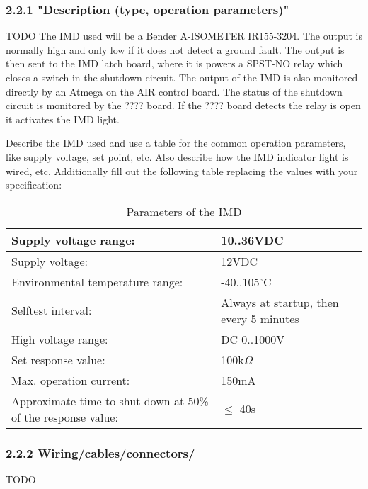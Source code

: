 \documentclass{article}
\begin{document}
\subsubsection*{2.2.1 "Description (type, operation parameters)"}

TODO
The IMD used will be a Bender A-ISOMETER IR155-3204. The output is normally high and only low if it does not detect a ground fault. The output is then sent to the IMD latch board, where it is powers a SPST-NO relay which closes a switch in the shutdown circuit. The output of the IMD is also monitored directly by an Atmega on the AIR control board. The status of the shutdown circuit is monitored by the ???? board. If the ???? board detects the relay is  open it activates the IMD light.


Describe the IMD used and use a table for the common operation parameters, like supply voltage, set point, etc. Also describe how the IMD indicator light is wired, etc.
Additionally fill out the following table replacing the values with your specification:


\begin{center}
	\begin{table}
		\begin{tabular}{|l|l|}
			\hline
			Supply voltage range: &  10..36VDC \\
			\hline
			Supply voltage: &  12VDC\\
			\hline
			Environmental temperature range: &  -40..105$^{\circ}$C \\
			\hline
			Selftest interval: &  Always at startup, then every 5 minutes \\
			\hline
			High voltage range: &  DC 0..1000V \\
			\hline
			Set response value: &  100k$\Omega$ \\
			\hline
			Max. operation current: &  150mA \\
			\hline
			Approximate time to shut down at 50\% of the response value:&  $\leq$ 40s \\
			\hline
		\end{tabular}
		\caption{Parameters of the IMD}
	\end{table}
\end{center}







\subsubsection*{2.2.2 Wiring/cables/connectors/}
TODO
\end{document}
